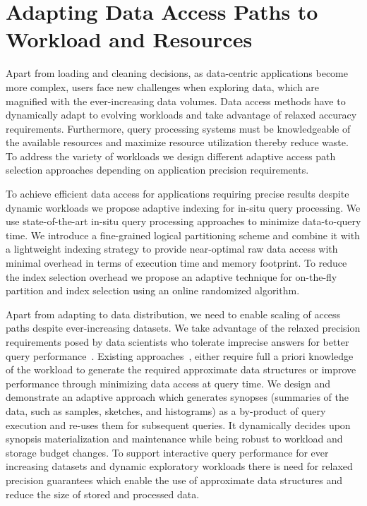 \section{Adapting Data Access Paths to Workload and Resources}
\label{sec:accesspaths}

Apart from loading and cleaning decisions,
as data-centric applications become more complex, users face new 
challenges when exploring data, which are magnified with the 
ever-increasing data volumes. %
Data access methods have to dynamically adapt to evolving workloads 
and take advantage of relaxed accuracy requirements. Furthermore, 
query processing systems must be knowledgeable of the available 
resources and maximize resource utilization thereby reduce waste. 
To address the variety of workloads we design different adaptive 
access path selection approaches depending on application precision 
requirements.

 To achieve 
efficient data access for applications requiring precise results 
despite dynamic workloads we propose adaptive indexing for in-situ 
query processing. We use state-of-the-art in-situ query 
processing approaches to minimize data-to-query time. We 
introduce a fine-grained logical partitioning scheme and combine it 
with a lightweight indexing strategy to provide near-optimal raw data 
access with minimal overhead in terms of execution time and memory
footprint. To reduce the index selection overhead we propose an 
adaptive technique for on-the-fly partition and index selection using 
an online randomized algorithm.

Apart from adapting to data distribution, we need to enable scaling 
of access paths despite ever-increasing datasets. We take advantage 
of the relaxed precision requirements posed by data scientists who 
tolerate imprecise answers for better query 
performance~\cite{Cormode2012}. 
Existing approaches~\cite{Agarwal2013,Chaudhuri2001b}, either require 
full a priori knowledge of the workload to generate the required 
approximate data structures or improve performance through minimizing 
data access at query time. We design and demonstrate an adaptive 
approach which generates synopses (summaries of the data, such as 
samples, sketches, and histograms) as a by-product of query execution 
and re-uses them for subsequent queries. It dynamically decides upon 
synopsis materialization and maintenance while being robust to 
workload and storage budget changes. To support interactive query 
performance for ever increasing datasets and dynamic exploratory 
workloads there is need for relaxed precision guarantees which enable 
the use of approximate data structures and reduce the size of stored 
and processed data.

